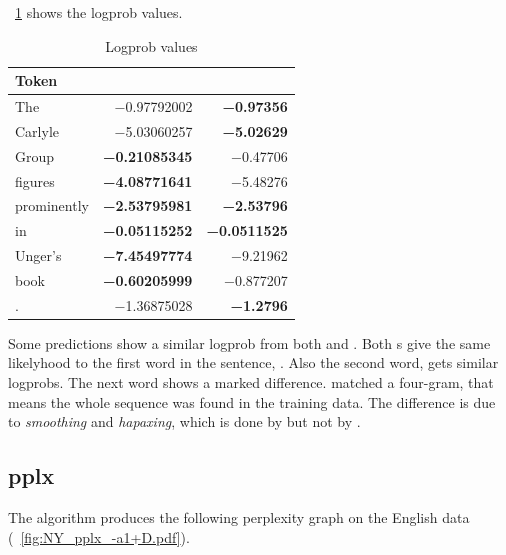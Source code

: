 \documentclass[a4paper,10pt,twoside]{report}
\begin{document}
\par
\tablename~\ref{tab:logprob} shows the logprob values.

\begin{table}[h!]
\caption{Logprob values}
\centering
\vspace{\baselineskip}
\begin{tabular}{ l r r }
\toprule
Token & \wopr{} & \srilm{} \\ [.5ex]
\midrule
The         &     \num{-0.97792002}  & \bf{\num{-0.97356}\phantom{00}} \\
Carlyle     &     \num{-5.03060257}  & \bf{\num{-5.02629}\phantom{00}} \\
Group       & \bf{\num{-0.21085345}} &     \num{-0.47706}\phantom{00} \\
figures     & \bf{\num{-4.08771641}} &     \num{-5.48276}\phantom{00} \\
prominently & \bf{\num{-2.53795981}} & \bf{\num{-2.53796}\phantom{00}} \\
in          & \bf{\num{-0.05115252}} & \bf{\num{-0.0511525}} \\
Unger's     & \bf{\num{-7.45497774}} &     \num{-9.21962}\phantom{00}  \\
book        & \bf{\num{-0.60205999}} &     \num{-0.877207}\phantom{0} \\
.           &     \num{-1.36875028}  & \bf{\num{-1.2796}\phantom{000}} \\
\bottomrule
\end{tabular}
\label{tab:logprob}
\end{table}

Some predictions show a similar logprob from both \wopr{} and
\srilm{}. Both \lm{}s give the same likelyhood to the first word in
the sentence, . Also the second word,  gets
similar logprobs. The next word shows a marked difference. \Srilm{}
matched a four-gram, that means the whole sequence  was found in the training data. The difference is due
to \emph{smoothing} and \emph{hapaxing}, which is done by \srilm{} but
not by \wopr{}.

\subsection{pplx}

The \igtree{} algorithm produces the following perplexity graph on the
English data (\figurename~\ref{fig:NY_pplx_-a1+D.pdf}).
\end{document}
